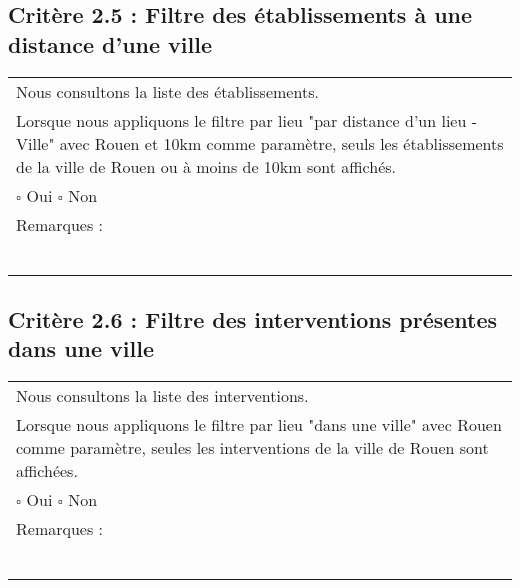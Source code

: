   	\subsection*{Critère 2.5 : Filtre des établissements à une distance d'une ville}
  		\begin{center}
    	 		\begin{tabular}[h]{|p{}|}
			\hline
				Nous consultons la liste des établissements. \\
				Lorsque nous appliquons le filtre par lieu "par distance d'un lieu - Ville" avec Rouen et 10km comme paramètre, seuls les établissements de la ville de Rouen ou à moins de 10km sont affichés. \\
						
				$\square$ Oui  \hfill \hfill $\square$ Non \\\hline Remarques : \\ ~\\
			 \\\hline
     		\end{tabular}
  		\end{center}	
  		
  	\subsection*{Critère 2.6 : Filtre des interventions présentes dans une ville}
  		\begin{center}
    	 		\begin{tabular}[h]{|p{}|}
			\hline
				Nous consultons la liste des interventions. \\
				Lorsque nous appliquons le filtre par lieu "dans une ville" avec Rouen comme paramètre, seules les interventions de la ville de Rouen sont affichées. \\
						
				$\square$ Oui  \hfill \hfill $\square$ Non \\\hline Remarques : \\ ~\\
			 \\\hline
     		\end{tabular}
  		\end{center}	
  		
